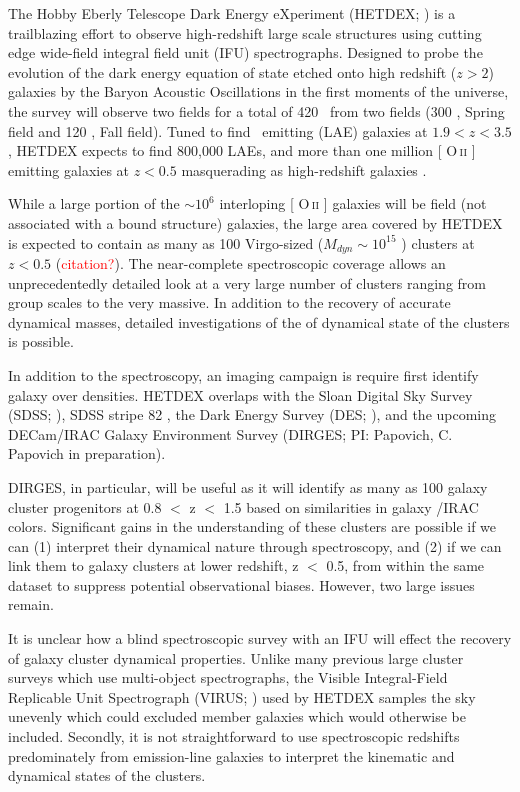 \documentclass[apj, revtex4]{emulateapj}
\makeatletter
\newcommand{\editorial}[1]{\textcolor{red}{#1}}
\DeclareRobustCommand{\ion}[2]{%
\relax\ifmmode
\ifx\testbx\f@series
{\mathbf{#1\,\mathsc{#2}}}\else
{\mathrm{#1\,\mathsc{#2}}}\fi
\else\textup{#1\,{\mdseries\textsc{#2}}}%
\fi}
\makeatother
\begin{document}
The Hobby Eberly Telescope Dark Energy eXperiment (HETDEX; \citealt{Hill2008}) is a trailblazing effort to observe high-redshift large scale structures using cutting edge wide-field integral field unit (IFU) spectrographs. Designed to probe the evolution of the dark energy equation of state etched onto high redshift ($z>2$) galaxies by the Baryon Acoustic Oscillations \citep{Eisenstein2005} in the first moments of the universe, the survey will observe two fields for a total of 420 \degsq\ from two fields (300 \degsq, Spring field and 120 \degsq, Fall field). Tuned to find \lya\ emitting (LAE) galaxies at $1.9<z<3.5$, HETDEX expects to find 800,000 LAEs, and more than one million [\ion{O}{ii}] emitting galaxies at $z<0.5$ masquerading as high-redshift galaxies \citep{Acquaviva2014}.  

While a large portion of the $\sim10^6$ interloping [\ion{O}{ii}] galaxies will be field (not associated with a bound structure) galaxies, the large area covered by HETDEX is expected to contain as many as 100 Virgo-sized ($M_{dyn}\sim 10^{15}$ \msol) clusters at $z<0.5$ (\editorial{citation?}). The near-complete spectroscopic coverage allows an unprecedentedly detailed look at a very large number of clusters ranging from group scales to the very massive. In addition to the recovery of accurate dynamical masses, detailed investigations of the of dynamical state of the clusters is possible. 

In addition to the spectroscopy, an imaging campaign is require first identify galaxy over densities. HETDEX overlaps with the Sloan Digital Sky Survey (SDSS; \citealt{Blanton2001a}), SDSS stripe 82 \citep{Annis2014}, the Dark Energy Survey (DES; \citealt{DES2005}), and the upcoming DECam/IRAC Galaxy Environment Survey (DIRGES; PI: Papovich, C. Papovich \etal in preparation).

DIRGES, in particular, will be useful as it will identify as many as 100 galaxy cluster progenitors at 0.8 $<$ z $<$ 1.5 based on similarities in galaxy \spitzer/IRAC colors. Significant gains in the understanding of these clusters are possible if we can (1) interpret their dynamical nature through spectroscopy, and (2) if we can link them to galaxy clusters at lower redshift, z $<$ 0.5, from within the same dataset to suppress potential observational biases. However, two large issues remain.

It is unclear how a blind spectroscopic survey with an IFU will effect the recovery of galaxy cluster dynamical properties. Unlike many previous large cluster surveys  which use multi-object spectrographs, the Visible Integral-Field Replicable Unit Spectrograph (VIRUS; \citealt{Hill2012}) used by HETDEX samples the sky unevenly which could excluded member galaxies which would otherwise be included. Secondly, it is not straightforward to use spectroscopic redshifts predominately from emission-line galaxies to interpret the kinematic and dynamical states of the clusters.
\end{document}
